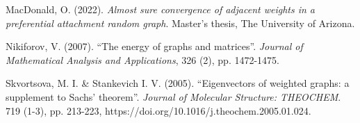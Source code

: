 \documentclass[a4paper]{article}
\theoremstyle{plain}
\begin{document}
\begin{thebibliography}{9}
 MacDonald, O. (2022). \textit{Almost sure convergence of adjacent weights in a preferential attachment random graph}. Master’s thesis, The University of Arizona. 

  Nikiforov, V. (2007). ``The energy of graphs and matrices''. \textit{Journal of Mathematical Analysis and Applications}, 326 (2), pp. 1472-1475.    
    
     Skvortsova, M. I. \& Stankevich I. V. (2005). ``Eigenvectors of weighted graphs: a supplement to Sachs' theorem''. \textit{Journal of Molecular Structure: THEOCHEM}. 719 (1-3), pp. 213-223, https://doi.org/10.1016/j.theochem.2005.01.024.
    
\end{thebibliography}
\end{document}
